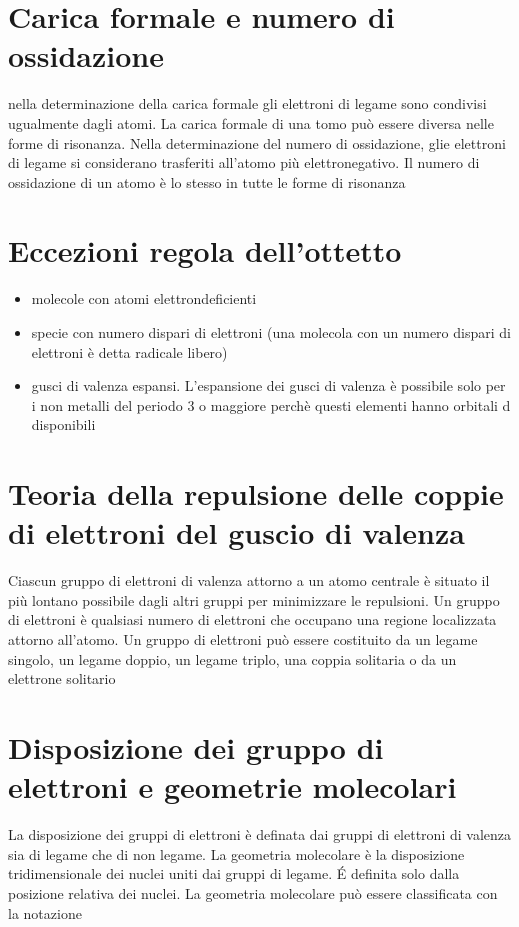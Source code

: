\documentclass[a4paper,11pt]{report}
\begin{document}
\section{Carica formale e numero di ossidazione}

nella determinazione della carica formale gli elettroni di legame sono condivisi ugualmente dagli atomi. La carica formale di una tomo può essere diversa nelle forme di risonanza. Nella determinazione del numero di ossidazione, glie elettroni di legame si considerano trasferiti all'atomo più elettronegativo. Il numero di ossidazione di un atomo è lo stesso in tutte le forme di risonanza

\section{Eccezioni regola dell'ottetto}

\begin{itemize}
	\item molecole con atomi elettrondeficienti
	\item specie con numero dispari di elettroni (una molecola con un numero dispari di elettroni è detta radicale libero)
	\item gusci di valenza espansi. L'espansione dei gusci di valenza è possibile solo per i non metalli del periodo 3 o maggiore perchè questi elementi hanno orbitali d disponibili
\end{itemize}

\section{Teoria della repulsione delle coppie di elettroni del guscio di valenza}

Ciascun gruppo di elettroni di valenza attorno a un atomo centrale è situato il più lontano possibile dagli altri gruppi per minimizzare le repulsioni. Un gruppo di elettroni è qualsiasi numero di elettroni che occupano una regione localizzata attorno all'atomo. Un gruppo di elettroni può essere costituito da un legame singolo, un legame doppio, un legame triplo, una coppia solitaria o da un elettrone solitario

\section{Disposizione dei gruppo di elettroni e geometrie molecolari}

La disposizione dei gruppi di elettroni è definata dai gruppi di elettroni di valenza sia di legame che di non legame. La geometria molecolare è la disposizione tridimensionale dei nuclei uniti dai gruppi di legame. \'E definita solo dalla posizione relativa dei nuclei. La geometria molecolare può essere classificata con la notazione
\end{document}
